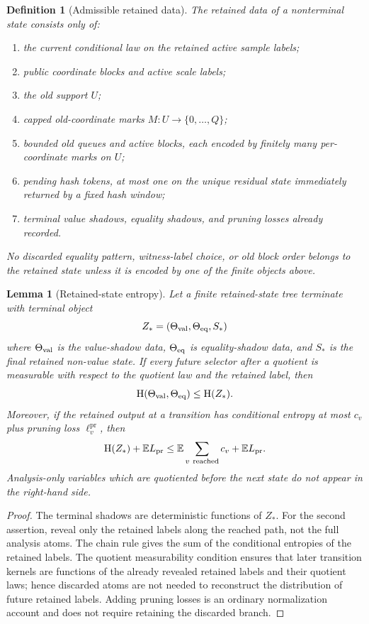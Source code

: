\documentclass[11pt]{article}
\newtheorem{lemma}[theorem]{Lemma}
\newtheorem{definition}[theorem]{Definition}
\theoremstyle{remark}
\newcommand{\E}{\mathbb E}
\newcommand{\HH}{\mathrm H}
\newcommand{\pr}{\mathrm{pr}}
\begin{document}
\begin{definition}[Admissible retained data]\label{def:retained-data}
The retained data of a nonterminal state consists only of:
\begin{enumerate}[label=\textup{(\roman*)}]
\item the current conditional law on the retained active sample labels;
\item public coordinate blocks and active scale labels;
\item the old support $U$;
\item capped old-coordinate marks $M:U\to\{0,\ldots,Q\}$;
\item bounded old queues and active blocks, each encoded by finitely many per-coordinate marks on $U$;
\item pending hash tokens, at most one on the unique residual state immediately returned by a fixed hash window;
\item terminal value shadows, equality shadows, and pruning losses already recorded.
\end{enumerate}
No discarded equality pattern, witness-label choice, or old block order belongs to the retained state unless it is encoded by one of the finite objects above.
\end{definition}

\begin{lemma}[Retained-state entropy]\label{lem:retained-entropy}
Let a finite retained-state tree terminate with terminal object
\[
        Z_*=(\Theta_{\rm val},\Theta_{\rm eq},S_*)
\]
where $\Theta_{\rm val}$ is the value-shadow data, $\Theta_{\rm eq}$ is equality-shadow data, and $S_*$ is the final retained non-value state.  If every future selector after a quotient is measurable with respect to the quotient law and the retained label, then
\[
        \HH(\Theta_{\rm val},\Theta_{\rm eq})\le \HH(Z_*).
\]
Moreover, if the retained output at a transition has conditional entropy at most $c_v$ plus pruning loss $\ell^{\pr}_v$, then
\[
        \HH(Z_*)+\E L_{\pr}\le \E\sum_{v\ {\rm reached}} c_v+\E L_{\pr}.
\]
Analysis-only variables which are quotiented before the next state do not appear in the right-hand side.
\end{lemma}

\begin{proof}
The terminal shadows are deterministic functions of $Z_*$.  For the second assertion, reveal only the retained labels along the reached path, not the full analysis atoms.  The chain rule gives the sum of the conditional entropies of the retained labels.  The quotient measurability condition ensures that later transition kernels are functions of the already revealed retained labels and their quotient laws; hence discarded atoms are not needed to reconstruct the distribution of future retained labels.  Adding pruning losses is an ordinary normalization account and does not require retaining the discarded branch.
\end{proof}
\end{document}
